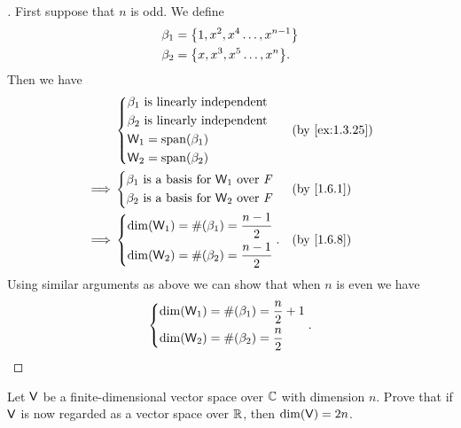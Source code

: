 \begin{proof}[]
  First suppose that \(n\) is odd.
  We define
  \begin{align*}
    \beta_1 & = \set{1, x^2, x^4 \dots, x^{n - 1}} \\
    \beta_2 & = \set{x, x^3, x^5 \dots, x^n}.
  \end{align*}
  Then we have
  \begin{align*}
             & \begin{dcases}
                 \beta_1 \text{ is linearly independent} \\
                 \beta_2 \text{ is linearly independent} \\
                 \W_1 = \spn{\beta_1}                    \\
                 \W_2 = \spn{\beta_2}
               \end{dcases}               &  & \by{ex:1.3.25}        \\
    \implies & \begin{dcases}
                 \beta_1 \text{ is a basis for } \W_1 \text{ over } \F \\
                 \beta_2 \text{ is a basis for } \W_2 \text{ over } \F
               \end{dcases} &  & \by{1.6.1} \\
    \implies & \begin{dcases}
                 \dim(\W_1) = \#(\beta_1) = \dfrac{n - 1}{2} \\
                 \dim(\W_2) = \#(\beta_2) = \dfrac{n - 1}{2}
               \end{dcases}.           &  & \by{1.6.8}
  \end{align*}
  Using similar arguments as above we can show that when \(n\) is even we have
  \[
    \begin{dcases}
      \dim(\mathsf{W}_1) = \#(\beta_1) = \dfrac{n}{2} + 1 \\
      \dim(\mathsf{W}_2) = \#(\beta_2) = \dfrac{n}{2}
    \end{dcases}.
  \]
\end{proof}

\begin{ex}\label{ex:1.6.28}
  Let \(\mathsf{V}\) be a finite-dimensional vector space over \(\mathbb{C}\) with dimension \(n\).
  Prove that if \(\mathsf{V}\) is now regarded as a vector space over \(\mathbb{R}\), then \(\dim(\mathsf{V}) = 2n\).
\end{ex}


